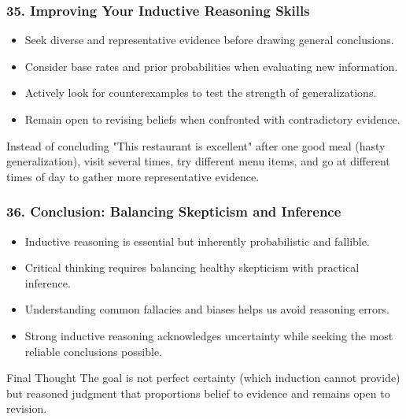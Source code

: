 \documentclass{beamer}
\begin{document}
\begin{frame}
\frametitle{35. Improving Your Inductive Reasoning Skills}
\begin{itemize}
    \item Seek diverse and representative evidence before drawing general conclusions.
    \item Consider base rates and prior probabilities when evaluating new information.
    \item Actively look for counterexamples to test the strength of generalizations.
    \item Remain open to revising beliefs when confronted with contradictory evidence.
\end{itemize}

\begin{example}
Instead of concluding "This restaurant is excellent" after one good meal (hasty generalization), visit several times, try different menu items, and go at different times of day to gather more representative evidence.
\end{example}
\end{frame}

\begin{frame}
\frametitle{36. Conclusion: Balancing Skepticism and Inference}
\begin{itemize}
    \item Inductive reasoning is essential but inherently probabilistic and fallible.
    \item Critical thinking requires balancing healthy skepticism with practical inference.
    \item Understanding common fallacies and biases helps us avoid reasoning errors.
    \item Strong inductive reasoning acknowledges uncertainty while seeking the most reliable conclusions possible.
\end{itemize}

\begin{block}{Final Thought}
The goal is not perfect certainty (which induction cannot provide) but reasoned judgment that proportions belief to evidence and remains open to revision.
\end{block}
\end{frame}
\end{document}
